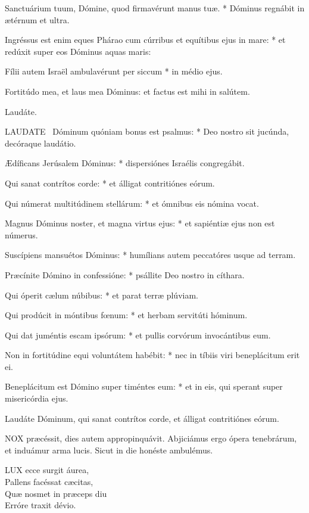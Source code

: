 Sanctuárium tuum, Dómine, quod firmavérunt manus tuæ. * Dóminus regnábit in ætérnum et ultra.

Ingréssus est enim eques Phárao cum cúrribus et equítibus ejus in mare: * et redúxit super eos Dóminus aquas maris:

Fílii autem Israël ambulavérunt per siccum * in médio ejus.

 Fortitúdo mea, et laus mea Dóminus: et factus est mihi in salútem.

 Laudáte. \textdagger


\lettrine[lines=2]{L}{AUDATE} \textdagger\ Dóminum quóniam bonus est psalmus: * Deo nostro sit jucúnda, decóraque laudátio.

Ædíficans Jerúsalem Dóminus: * dispersiónes Israélis congregábit.

Qui sanat contrítos corde: * et álligat contritiónes eórum.

Qui númerat multitúdinem stellárum: * et ómnibus eis nómina vocat.

Magnus Dóminus noster, et magna virtus ejus: * et sapiéntiæ ejus non est númerus.

Suscípiens mansuétos Dóminus: * humílians autem peccatóres usque ad terram.

Præcínite Dómino in confessióne: * psállite Deo nostro in cíthara.

Qui óperit cælum núbibus: * et parat terræ plúviam.

Qui prodúcit in móntibus fœnum: * et herbam servitúti hóminum.

Qui dat juméntis escam ipsórum: * et pullis corvórum invocántibus eum.

Non in fortitúdine equi voluntátem habébit: * nec in tíbiis viri beneplácitum erit ei.

Beneplácitum est Dómino super timéntes eum: * et in eis, qui sperant super misericórdia ejus.

 Laudáte Dóminum, qui sanat contrítos corde, et álligat contritiónes eórum.


\lettrine[lines=2]{N}{OX} præcéssit, dies autem appropinquávit. Abjiciámus ergo ópera tenebrárum, et induámur arma lucis. Sicut in die honéste ambulémus.


\lettrine[lines=2]{L}{UX} ecce surgit áurea,\\
Pallens facéssat cæcitas,\\
Quæ nosmet in præceps diu\\
Erróre traxit dévio.

